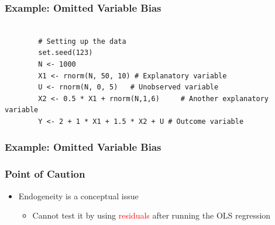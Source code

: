 \documentclass{beamer}
\begin{document}
\begin{frame}[fragile]
	\frametitle{Example: Omitted Variable Bias}
	\begin{lstlisting}
		
		# Setting up the data
		set.seed(123)
		N <- 1000
		X1 <- rnorm(N, 50, 10) # Explanatory variable
		U <- rnorm(N, 0, 5)   # Unobserved variable
		X2 <- 0.5 * X1 + rnorm(N,1,6)     # Another explanatory variable
		Y <- 2 + 1 * X1 + 1.5 * X2 + U # Outcome variable
	\end{lstlisting}
\end{frame}


\begin{frame}
		\frametitle{Example: Omitted Variable Bias}
	\small
	\begin{table} \centering 
	\end{table} 
\end{frame}


\begin{frame}
	\frametitle{Point of Caution}
	\begin{itemize}
		\item Endogeneity is a conceptual issue
			\begin{itemize}
				\item Cannot test it by using \textcolor{red}{residuals} after running the OLS regression
			\end{itemize}
	\end{itemize}
\end{frame}
\end{document}
